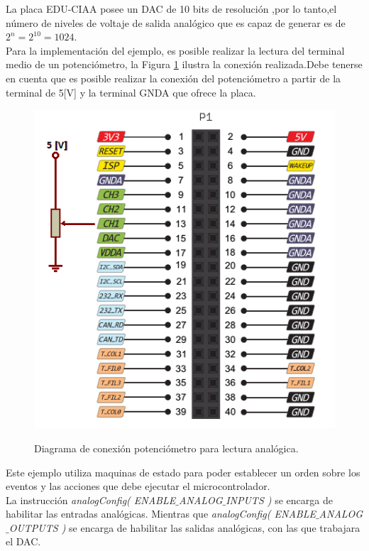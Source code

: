 \documentclass[12pt,letterpaper]{article}
\begin{document}
La placa EDU-CIAA posee un DAC de 10 bits de resolución ,por lo tanto,el número de niveles de voltaje de salida analógico que es capaz de generar es de $2^{n}=2^{10}=1024$.
 \\
 
Para la implementación del ejemplo, es posible realizar la lectura del terminal medio de un potenciómetro, la Figura \ref{Fig24} ilustra la conexión realizada.Debe tenerse en cuenta que es posible realizar la conexión del potenciómetro a partir de la terminal de 5[V] y la terminal GNDA que ofrece la placa.

\begin{figure}[H]
\centering
\includegraphics[width=6 cm]{figuras/f6.png}\\
\caption{Diagrama de conexión potenciómetro para lectura analógica.}
\label{Fig24}
\end{figure}

Este ejemplo utiliza maquinas de estado para poder establecer un orden sobre los eventos y las acciones que debe ejecutar el microcontrolador.
 \\
 
La instrucción \textit{analogConfig( ENABLE$\_$ANALOG$\_$INPUTS )} se encarga de habilitar las entradas analógicas. Mientras que \textit{analogConfig( ENABLE$\_$ANALOG$\_$OUTPUTS )} se encarga de habilitar las salidas analógicas, con las que trabajara el DAC.
\end{document}
